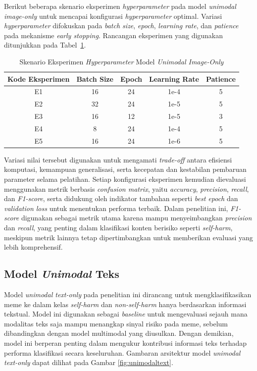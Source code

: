 Berikut beberapa skenario eksperimen \textit{hyperparameter} pada model \textit{unimodal image-only} untuk mencapai konfigurasi \textit{hyperparameter} optimal. Variasi \textit{hyperparameter} difokuskan pada \textit{batch size}, \textit{epoch}, \textit{learning rate}, dan \textit{patience} pada mekanisme \textit{early stopping}. Rancangan eksperimen yang digunakan ditunjukkan pada Tabel~\ref{tabel:skenario_hyperparameter_unimodal_image_only}.

\begin{table}[H]
    \centering
    \caption{Skenario Eksperimen \textit{Hyperparameter} Model \textit{Unimodal Image-Only}}
    \label{tabel:skenario_hyperparameter_unimodal_image_only}
    \small
    \setlength{\tabcolsep}{8pt}
    \renewcommand{\arraystretch}{1.1}
    \begin{tabular}{c c c c c}
        \hline
        \textbf{Kode Eksperimen} & \textbf{Batch Size} & \textbf{Epoch} & \textbf{Learning Rate} & \textbf{Patience} \\
        \hline
        E1 & 16 & 24 & 1e-4 & 5 \\
        E2 & 32 & 24 & 1e-5 & 5 \\
        E3 & 16 & 12 & 1e-5 & 3 \\
        E4 & 8 & 24 & 1e-4 & 5 \\
        E5 & 16 & 24 & 1e-6 & 5 \\
        \hline
    \end{tabular}
\end{table}

 Variasi nilai tersebut digunakan untuk mengamati \textit{trade-off} antara efisiensi komputasi, kemampuan generalisasi, serta kecepatan dan kestabilan pembaruan parameter selama pelatihan. Setiap konfigurasi eksperimen kemudian dievaluasi menggunakan metrik berbasis \textit{confusion matrix}, yaitu \textit{accuracy}, \textit{precision}, \textit{recall}, dan \textit{F1-score}, serta didukung oleh indikator tambahan seperti \textit{best epoch} dan \textit{validation loss} untuk menentukan performa terbaik. Dalam penelitian ini, \textit{F1-score} digunakan sebagai metrik utama karena mampu menyeimbangkan \textit{precision} dan \textit{recall}, yang penting dalam klasifikasi konten berisiko seperti \textit{self-harm}, meskipun metrik lainnya tetap dipertimbangkan untuk memberikan evaluasi yang lebih komprehensif.



\subsection{Model \textit{Unimodal} Teks} \label{unimodal teks}
Model \textit{unimodal text-only} pada penelitian ini dirancang untuk mengklasifikasikan meme ke dalam kelas \textit{self-harm} dan \textit{non-self-harm} hanya berdasarkan informasi tekstual. Model ini digunakan sebagai \textit{baseline} untuk mengevaluasi sejauh mana modalitas teks saja mampu menangkap sinyal risiko pada meme, sebelum dibandingkan dengan model multimodal yang diusulkan. Dengan demikian, model ini berperan penting dalam mengukur kontribusi informasi teks terhadap performa klasifikasi secara keseluruhan. Gambaran arsitektur model \textit{unimodal text-only} dapat dilihat pada Gambar \ref{fig:unimodaltext}.

